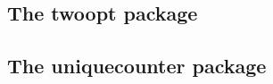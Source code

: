 \documentclass[a4paper,12pt]{article}
\makeatletter
\newcommand*{\xpackage}[1]{\textsf{#1}}
\newcommand*{\tocinclude}[1]{%
  \setcounter{tocdepth}{3}%
  \begingroup
    \makeatletter
    \def\@prj{#1}%
    \let\contentsline\foreign@contentsline
  \endgroup
}
\def\foreign@contentsline#1#2#3#4{%
  \ifx\\#4\\%
    \csname l@#1\endcsname{#2}{#3}%
  \else
    \ifHy@linktocpage
      \csname l@#1\endcsname{{#2}}{%
        \hyper@linkfile{#3}{\@prj.pdf}{#4}%
      }%
    \else
      \csname l@#1\endcsname{%
        \hyper@linkfile{#2}{\@prj.pdf}{#4}%
      }{#3}%
    \fi
  \fi
}%
\newcommand*{\pkgsectformat}[1]{%
  \texorpdfstring{%
    \textcolor{link}{The} %
    \xpackage{#1} %
    \textcolor{link}{package}%
  }{#1}%
}
\makeatother
\begin{document}
\newpage
\subsection{\pkgsectformat{twoopt}}
\label{twoopt}
\begin{abstract}
This package provides commands to define macros with two
optional arguments.
\end{abstract}
\tocinclude{twoopt}

\newpage
\subsection{\pkgsectformat{uniquecounter}}
\label{uniquecounter}
\begin{abstract}
This package provides a kind of counter that provides unique
number values. Several counters can be created by different names.
The numeric values are not limited.
\end{abstract}
\tocinclude{uniquecounter}
\end{document}
